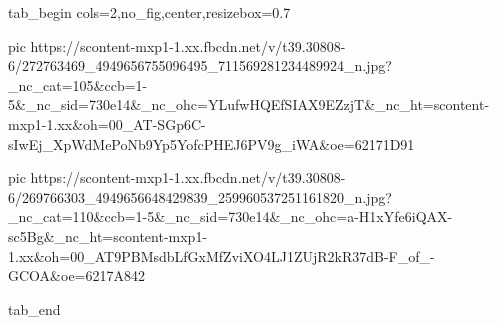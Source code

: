  
 
 
 
 


\ifcmt
  tab_begin cols=2,no_fig,center,resizebox=0.7

     pic https://scontent-mxp1-1.xx.fbcdn.net/v/t39.30808-6/272763469_4949656755096495_711569281234489924_n.jpg?_nc_cat=105&ccb=1-5&_nc_sid=730e14&_nc_ohc=YLufwHQEfSIAX9EZzjT&_nc_ht=scontent-mxp1-1.xx&oh=00_AT-SGp6C-sIwEj_XpWdMePoNb9Yp5YofcPHEJ6PV9g_iWA&oe=62171D91

     pic https://scontent-mxp1-1.xx.fbcdn.net/v/t39.30808-6/269766303_4949656648429839_259960537251161820_n.jpg?_nc_cat=110&ccb=1-5&_nc_sid=730e14&_nc_ohc=a-H1xYfe6iQAX-sc5Bg&_nc_ht=scontent-mxp1-1.xx&oh=00_AT9PBMsdbLfGxMfZviXO4LJ1ZUjR2kR37dB-F_of_-GCOA&oe=6217A842

  tab_end
\fi
